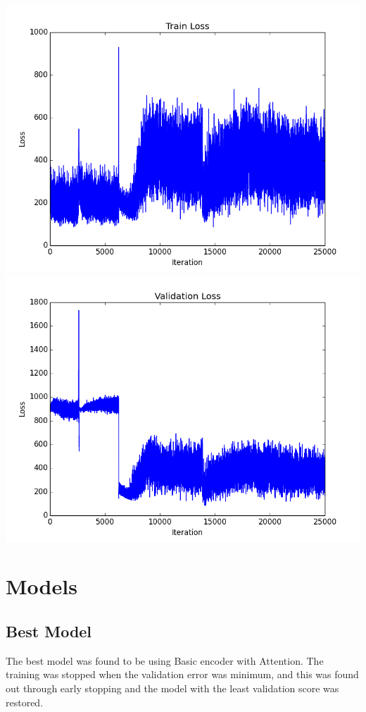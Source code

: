 \documentclass[12pt]{report}
\begin{document}
\begin{center}
\includegraphics[scale=0.5]{train_loss2.png} \\
\vspace{3mm}
\includegraphics[scale=0.5]{valid_loss2.png} 
\end{center}

\section{Models}
\subsection{Best Model}
The best model was found to be using Basic encoder with Attention. The training was stopped when the validation error was minimum, and this was found out through early stopping and the model with the least validation score was restored.
\end{document}
